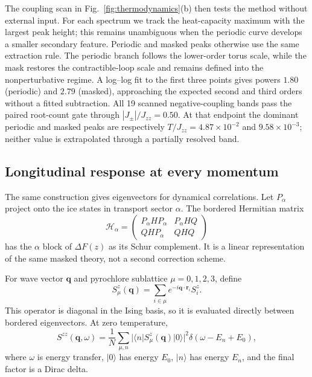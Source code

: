 \documentclass[aps,prb,twocolumn,amsmath,amssymb,superscriptaddress,
longbibliography,floatfix]{revtex4-2}
\newcommand{\Jzz}{J_{zz}}
\newcommand{\Jpm}{J_{\pm}}
\newcommand{\bq}{\bm q}
\newcommand{\br}{\bm r}
\begin{document}
The
coupling scan in Fig.~\ref{fig:thermodynamics}(b) then tests the method without
external input.  For each spectrum we track the heat-capacity maximum with the
largest peak height; this remains unambiguous when the periodic curve develops
a smaller secondary feature.  Periodic and masked peaks otherwise use the same
extraction rule.
The periodic branch follows the lower-order torus scale, while the mask
restores the contractible-loop scale and remains defined into the
nonperturbative regime.  A log--log fit to the first three points gives powers
$1.80$ (periodic) and $2.79$ (masked), approaching the expected second and
third orders without a fitted subtraction.  All 19 scanned negative-coupling
bands pass the paired root-count gate through $|\Jpm|/\Jzz=0.50$.  At that
endpoint the dominant periodic and masked peaks are respectively
$T/\Jzz=4.87\times10^{-2}$ and $9.58\times10^{-3}$; neither value is
extrapolated through a partially resolved band.

\subsection{Longitudinal response at every momentum}
\label{sec:szz}

The same construction gives eigenvectors for dynamical correlations.  Let
$P_\alpha$ project onto the ice states in transport sector $\alpha$.  The
bordered Hermitian matrix
\begin{equation}
 \mathcal H_\alpha=
 \begin{pmatrix}
 P_\alpha HP_\alpha & P_\alpha HQ\\
 QHP_\alpha & QHQ
 \end{pmatrix}
 \label{eq:bordered}
\end{equation}
has the $\alpha$ block of $\Delta F(z)$ as its Schur complement.  It is a
linear representation of the same masked theory, not a second correction
scheme.

For wave vector $\bq$ and pyrochlore sublattice $\mu=0,1,2,3$, define
\begin{equation}
 S^z_\mu(\bq)=\sum_{i\in\mu}e^{-i\bq\cdot\br_i}S_i^z.
 \label{eq:probe}
\end{equation}
This operator is diagonal in the Ising basis, so it is evaluated directly
between bordered eigenvectors.  At zero temperature,
\begin{equation}
 S^{zz}(\bq,\omega)=\frac1N\sum_{\mu,n}
 |\langle n|S^z_\mu(\bq)|0\rangle|^2
 \delta(\omega-E_n+E_0),
 \label{eq:szz}
\end{equation}
where $\omega$ is energy transfer, $|0\rangle$ has energy $E_0$, $|n\rangle$
has energy $E_n$, and the final factor is a Dirac delta.
\end{document}
